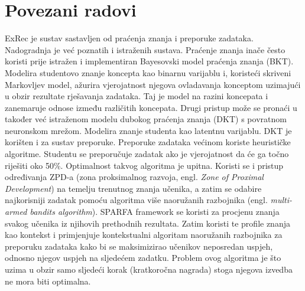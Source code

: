 \documentclass[times, utf8,projekt]{fer}
\begin{document}
\section{Povezani radovi} %
ExRec je sustav sastavljen od praćenja znanja i preporuke zadataka. Nadogradnja je već poznatih i istraženih sustava. Praćenje znanja inače često koristi prije istražen i implementiran Bayesovski model praćenja znanja (BKT). Modelira studentovo znanje koncepta kao binarnu varijablu i, koristeći skriveni Markovljev model, ažurira vjerojatnost njegova ovladavanja konceptom uzimajući u obzir rezultate rješavanja zadataka. Taj je model na razini koncepata i zanemaruje odnose između različitih koncepata.\newline
Drugi pristup može se pronaći u također već istraženom modelu dubokog praćenja znanja (DKT) s povratnom neuronskom mrežom. Modelira znanje studenta kao latentnu varijablu. DKT je korišten i za sustav preporuke.\newline
\newline
Preporuke zadataka većinom koriste heurističke algoritme. Studentu se preporučuje zadatak ako je vjerojatnost da će ga točno riješiti oko 50\%. Optimalnost takvog algoritma je upitna.\newline
Koristi se i pristup određivanja ZPD-a (zona proksimalnog razvoja, engl. \textit{Zone of Proximal Development}) na temelju trenutnog znanja učenika, a zatim se odabire najkorisniji zadatak pomoću algoritma više naoružanih razbojnika (engl.\textit{ multi-armed bandits algorithm}).\newline
SPARFA framework se koristi za procjenu znanja svakog učenika iz njihovih prethodnih rezultata. Zatim koristi te profile znanja kao kontekst i primjenjuje kontekstualni algoritam naoružanih razbojnika za preporuku zadataka kako bi se maksimizirao učenikov neposredan uspjeh, odnosno njegov uspjeh na sljedećem zadatku. Problem ovog algoritma je što uzima u obzir samo sljedeći korak (kratkoročna nagrada) stoga njegova izvedba ne mora biti optimalna.\newline
\newline
\end{document}
